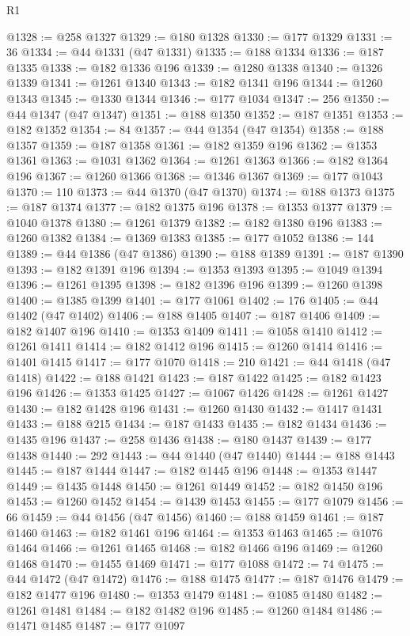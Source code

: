 \begin{lexlean}{R1}
\begin{coremodule}
@1328 := @258 @1327
@1329 := @180 @1328
@1330 := @177 @1329
@1331 := 36
@1334 := @44 @1331 (@47 @1331)
@1335 := @188 @1334
@1336 := @187 @1335
@1338 := @182 @1336 @196
@1339 := @1280 @1338
@1340 := @1326 @1339
@1341 := @1261 @1340
@1343 := @182 @1341 @196
@1344 := @1260 @1343
@1345 := @1330 @1344
@1346 := @177 @1034
@1347 := 256
@1350 := @44 @1347 (@47 @1347)
@1351 := @188 @1350
@1352 := @187 @1351
@1353 := @182 @1352
@1354 := 84
@1357 := @44 @1354 (@47 @1354)
@1358 := @188 @1357
@1359 := @187 @1358
@1361 := @182 @1359 @196
@1362 := @1353 @1361
@1363 := @1031 @1362
@1364 := @1261 @1363
@1366 := @182 @1364 @196
@1367 := @1260 @1366
@1368 := @1346 @1367
@1369 := @177 @1043
@1370 := 110
@1373 := @44 @1370 (@47 @1370)
@1374 := @188 @1373
@1375 := @187 @1374
@1377 := @182 @1375 @196
@1378 := @1353 @1377
@1379 := @1040 @1378
@1380 := @1261 @1379
@1382 := @182 @1380 @196
@1383 := @1260 @1382
@1384 := @1369 @1383
@1385 := @177 @1052
@1386 := 144
@1389 := @44 @1386 (@47 @1386)
@1390 := @188 @1389
@1391 := @187 @1390
@1393 := @182 @1391 @196
@1394 := @1353 @1393
@1395 := @1049 @1394
@1396 := @1261 @1395
@1398 := @182 @1396 @196
@1399 := @1260 @1398
@1400 := @1385 @1399
@1401 := @177 @1061
@1402 := 176
@1405 := @44 @1402 (@47 @1402)
@1406 := @188 @1405
@1407 := @187 @1406
@1409 := @182 @1407 @196
@1410 := @1353 @1409
@1411 := @1058 @1410
@1412 := @1261 @1411
@1414 := @182 @1412 @196
@1415 := @1260 @1414
@1416 := @1401 @1415
@1417 := @177 @1070
@1418 := 210
@1421 := @44 @1418 (@47 @1418)
@1422 := @188 @1421
@1423 := @187 @1422
@1425 := @182 @1423 @196
@1426 := @1353 @1425
@1427 := @1067 @1426
@1428 := @1261 @1427
@1430 := @182 @1428 @196
@1431 := @1260 @1430
@1432 := @1417 @1431
@1433 := @188 @215
@1434 := @187 @1433
@1435 := @182 @1434
@1436 := @1435 @196
@1437 := @258 @1436
@1438 := @180 @1437
@1439 := @177 @1438
@1440 := 292
@1443 := @44 @1440 (@47 @1440)
@1444 := @188 @1443
@1445 := @187 @1444
@1447 := @182 @1445 @196
@1448 := @1353 @1447
@1449 := @1435 @1448
@1450 := @1261 @1449
@1452 := @182 @1450 @196
@1453 := @1260 @1452
@1454 := @1439 @1453
@1455 := @177 @1079
@1456 := 66
@1459 := @44 @1456 (@47 @1456)
@1460 := @188 @1459
@1461 := @187 @1460
@1463 := @182 @1461 @196
@1464 := @1353 @1463
@1465 := @1076 @1464
@1466 := @1261 @1465
@1468 := @182 @1466 @196
@1469 := @1260 @1468
@1470 := @1455 @1469
@1471 := @177 @1088
@1472 := 74
@1475 := @44 @1472 (@47 @1472)
@1476 := @188 @1475
@1477 := @187 @1476
@1479 := @182 @1477 @196
@1480 := @1353 @1479
@1481 := @1085 @1480
@1482 := @1261 @1481
@1484 := @182 @1482 @196
@1485 := @1260 @1484
@1486 := @1471 @1485
@1487 := @177 @1097

\end{coremodule}
\end{lexlean}
